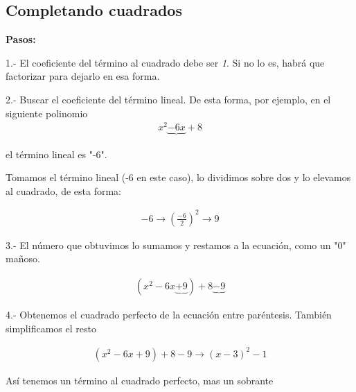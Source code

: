 \subsection{Completando cuadrados}

\textbf{Pasos:}

1.- El coeficiente del término al cuadrado debe ser \textit{1}. Si no lo es, habrá que factorizar para dejarlo en esa forma.

2.- Buscar el coeficiente del término lineal. De esta forma, por ejemplo, en el siguiente polinomio
\begin{align*}
    x^2 \underbrace{- 6x} + 8
\end{align*}

el término lineal es "-6".

Tomamos el término lineal (-6 en este caso), lo dividimos sobre dos y lo elevamos al cuadrado, de esta forma:

\begin{align*}
    -6 \longrightarrow \left( \frac{-6}{2} \right)^2
    \longrightarrow 9
\end{align*}

3.- El número que obtuvimos lo sumamos y restamos a la ecuación, como un "0" mañoso.

\begin{align*}
    (x^2 - 6x \underbrace{+ 9} ) + 8 \underbrace{- 9}
\end{align*}

4.- Obtenemos el cuadrado perfecto de la ecuación entre paréntesis. También simplificamos el resto

\begin{align*}
    (x^2 - 6x + 9) + 8 - 9 \longrightarrow (x - 3)^2 - 1
\end{align*}

Así tenemos un término al cuadrado perfecto, mas un sobrante



